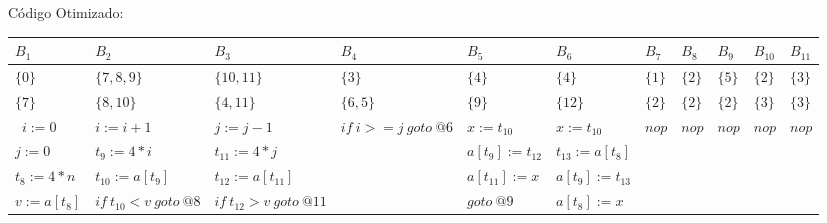 C\'odigo Otimizado:

\begin{table}[ht]
\begin{scriptsize}
\begin{tabular}{l|l|l|l|l|l|l|l|l|l|l}
$B_{1}$ & $B_{2}$ & $B_{3}$ & $B_{4}$ & $B_{5}$ & $B_{6}$ & $B_{7}$ & $B_{8}$ & $B_{9}$ & $B_{10}$ & $B_{11}$ \\
\hline
$\{0\}$ & $\{7, 8, 9\}$ & $\{10, 11\}$ & $\{3\}$ & $\{4\}$ & $\{4\}$ & $\{1\}$ & $\{2\}$ & $\{5\}$ & $\{2\}$ & $\{3\}$ \\
$\{7\}$ & $\{8, 10\}$ & $\{4, 11\}$ & $\{6, 5\}$ & $\{9\}$ & $\{12\}$ & $\{2\}$ & $\{2\}$ & $\{2\}$ & $\{3\}$ & $\{3\}$ \\
\hline\
$i:=0$ & $i:=i+1$ & $j:=j-1$ & $if\:i>=j\:goto\:@6$ & $x:=t_{10}$ & $x:=t_{10}$ & $nop$ & $nop$ & $nop$ & $nop$ & $nop$ \\
$j:=0$ & $t_{9}:=4*i$ & $t_{11}:=4*j$ &  & $a[t_{9}]:=t_{12}$ & $t_{13}:=a[t_{8}]$ &  &  &  &  &  \\
$t_{8}:=4*n$ & $t_{10}:=a[t_{9}]$ & $t_{12}:=a[t_{11}]$ &  & $a[t_{11}]:=x$ & $a[t_{9}]:=t_{13}$ &  &  &  &  &  \\
$v:=a[t_{8}]$ & $if\:t_{10}<v\:goto\:@8$ & $if\:t_{12}>v\:goto\:@11$ &  & $goto\:@9$ & $a[t_{8}]:=x$ &  &  &  &  &  \\
\end{tabular}
\end{scriptsize}
\end{table}

